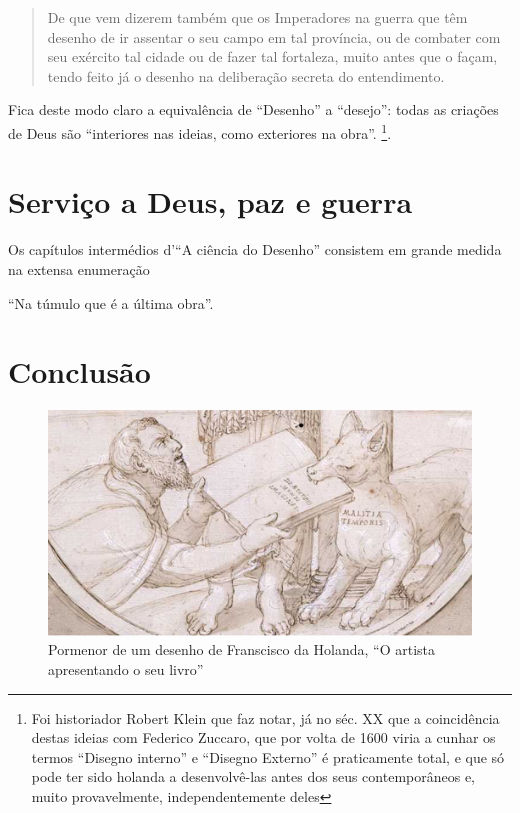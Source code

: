 \documentclass{article}
\begin{document}
\begin{quote}
  De que vem dizerem também que os Imperadores na guerra que têm
  desenho de ir assentar o seu campo em tal província, ou de combater
  com seu exército tal cidade ou de fazer tal fortaleza, muito antes
  que o façam, tendo feito já o desenho na deliberação secreta do
  entendimento.
\end{quote}\cite[fl.37v]{holanda}

Fica deste modo claro a equivalência de ``Desenho'' a ``desejo'':
todas as criações de Deus são ``interiores nas ideias, como exteriores
na obra''\cite[fl.37v]{holanda}. \footnote{Foi historiador Robert
  Klein que faz notar, já no séc. XX que a coincidência destas ideias
  com Federico Zuccaro, que por volta de 1600 viria a cunhar os termos
  ``Disegno interno'' e ``Disegno Externo'' é praticamente total, e
  que só pode ter sido holanda a desenvolvê-las antes dos seus
  contemporâneos e, muito provavelmente, independentemente deles}.

\section{Serviço a Deus, paz e guerra }

Os capítulos intermédios d'``A ciência do Desenho'' consistem em
grande medida na extensa enumeração 

``Na túmulo que é a última obra''.

\section{Conclusão}

\begin{figure}
\centering\includegraphics[height=0.3\textheight,keepaspectratio]
                          {images/malatia-temporis.png}
  \caption{Pormenor de um desenho de Franscisco da Holanda, ``O
    artista apresentando o seu livro''}
  \label{fig:3}
\end{figure}
\end{document}
